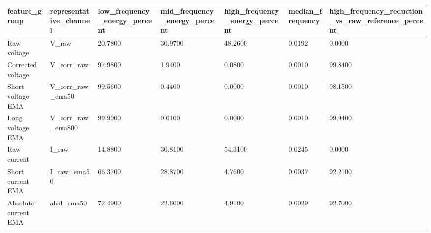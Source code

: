 \begin{tabular}{lllllll}
\hline
feature_group & representative_channel & low_frequency_energy_percent & mid_frequency_energy_percent & high_frequency_energy_percent & median_frequency & high_frequency_reduction_vs_raw_reference_percent \\
\hline
Raw voltage & V_raw & 20.7800 & 30.9700 & 48.2600 & 0.0192 & 0.0000 \\
Corrected voltage & V_corr_raw & 97.9800 & 1.9400 & 0.0800 & 0.0010 & 99.8400 \\
Short voltage EMA & V_corr_raw_ema50 & 99.5600 & 0.4400 & 0.0000 & 0.0010 & 98.1500 \\
Long voltage EMA & V_corr_raw_ema800 & 99.9900 & 0.0100 & 0.0000 & 0.0010 & 99.9400 \\
Raw current & I_raw & 14.8800 & 30.8100 & 54.3100 & 0.0245 & 0.0000 \\
Short current EMA & I_raw_ema50 & 66.3700 & 28.8700 & 4.7600 & 0.0037 & 92.2100 \\
Absolute-current EMA & absI_ema50 & 72.4900 & 22.6000 & 4.9100 & 0.0029 & 92.7000 \\
\hline
\end{tabular}
